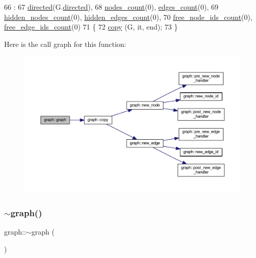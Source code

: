 \begin{DoxyCode}
66                                :
67     \mbox{\hyperlink{classgraph_ab4120df210eb3d03d20b0bd27f8cbe8c}{directed}}(G.\mbox{\hyperlink{classgraph_ab4120df210eb3d03d20b0bd27f8cbe8c}{directed}}),
68     \mbox{\hyperlink{classgraph_a1f59223d0bcf647920963d7a661dd74a}{nodes\_count}}(0), \mbox{\hyperlink{classgraph_af560ff4263ad165c166a46084e781b4a}{edges\_count}}(0),
69     \mbox{\hyperlink{classgraph_aa72548d972d226a69f7f8fb92b363860}{hidden\_nodes\_count}}(0), \mbox{\hyperlink{classgraph_a3151f544e049fbd985204ca9d8f74c97}{hidden\_edges\_count}}(0),
70     \mbox{\hyperlink{classgraph_a9480e2310fe64c3a8ad295bb3f119772}{free\_node\_ids\_count}}(0), \mbox{\hyperlink{classgraph_a336be547b5e0ca43b96cf00131e0e1da}{free\_edge\_ids\_count}}(0)
71 \{
72     \mbox{\hyperlink{classgraph_abc39d65a6ca3f3165bc71c7125dfd22e}{copy}} (G, it, end);
73 \}
\end{DoxyCode}
Here is the call graph for this function\+:\nopagebreak
\begin{figure}[H]
\begin{center}
\leavevmode
\includegraphics[width=350pt]{classgraph_ae4659f3efed5c60e85a19136f8f80a63_cgraph}
\end{center}
\end{figure}
\mbox{\label{classgraph_aeb62eaf197cdcb4800fa016eebc3d55a}} 
\subsubsection{\texorpdfstring{$\sim$graph()}{~graph()}}
{\footnotesize\ttfamily graph\+::$\sim$graph (\begin{DoxyParamCaption}{ }\end{DoxyParamCaption})\hspace{0.3cm}{\ttfamily [virtual]}}

